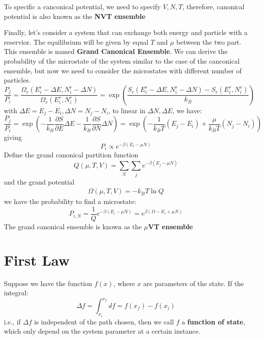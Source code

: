 \documentclass{article}
\begin{document}
To specific a canconical potential, we need to specify $V, N, T$, therefore, canonical potential 
is also known as the \textbf{NVT ensemble}

Finally, let's consider a system that can exchange both energy and particle with 
a reservior. The equilibrium will be given by equal $T$ and $\mu$ between the 
two part. This ensemble is named \textbf{Grand Canonical Ensemble}.
We can derive the probability of the microstate of the system similar to the 
case of the canconical ensemble, but now we need to consider the microstates with 
different number of particles. 
\begin{equation}
    \frac{P_j}{P_i} = \frac{\Omega_r(E^r_i - \Delta E, N^r_i - \Delta N)}{\Omega_r(E^r_i,N^r_i)} = \exp\left( \frac{S_r(E^r_i - \Delta E, N^r_i - \Delta N)-S_r(E^r_i,N^r_i)}{k_B} \right)
\end{equation}
with $\Delta E = E_j - E_i, \Delta N = N_j - N_i$, to linear in $\Delta N, \Delta E$, we have:
\begin{equation}
    \frac{P_j}{P_i} = \exp\left( -\frac{1}{k_B} \frac{\partial S}{\partial E} \Delta E - \frac{1}{k_B} \frac{\partial S}{\partial N} \Delta N \right)
    = \exp\left( -\frac{1}{k_BT} (E_j - E_i) + \frac{\mu}{k_BT} (N_j - N_i) \right)
\end{equation}
giving
\begin{equation}
    P_i \propto e^{-\beta (E_i - \mu N)}
\end{equation}
Define the grand canonical partition function 
\begin{equation}
    Q(\mu,T,V) = \sum_N\sum_j e^{-\beta (E_j - \mu N)}
\end{equation}
and the grand potential 
\begin{eqnarray}
    \Omega(\mu,T,V) = -k_BT\ln Q
\end{eqnarray}
we have the probability to find a microstate:
\begin{equation}
    P_{i,N} = \frac{1}{Q} e^{-\beta (E_i - \mu N)} = e^{\beta(\Omega - E_i + \mu N)}
\end{equation}
The grand canonical ensemble is known as the \textbf{$\mu$VT ensemble}


\section{First Law}
Suppose we have the function $f(x)$, where $x$ are parameters of the state. 
If the integral:
\begin{equation}
    \Delta f = \int_{x_i}^{x_f} df = f(x_f) - f(x_i) 
\end{equation}
i.e., if $\Delta f$ is independent of the path chosen, then we call $f$ a 
\textbf{function of state}, which only depend on the system parameter at a 
certain instance.
\end{document}
